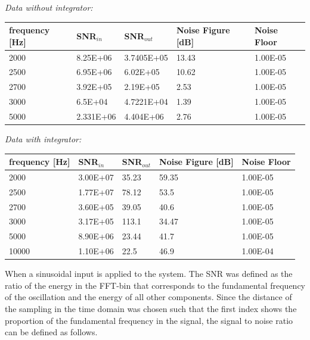 \textit{Data without integrator:}
\begin{center}
\begin{tabular}{|m{3cm}|m{3cm}|m{1.3cm}|m{4cm}|m{2cm}|} 
\hline
frequency [Hz]& SNR$_{in}$ & SNR$_{out}$ & Noise Figure [dB] & Noise Floor \\ 
\hline \hline
2000 &  8.25E+06 &  3.7405E+05 & 13.43 & 1.00E-05 \\ 
\hline
2500 & 6.95E+06 & 6.02E+05 & 10.62 & 1.00E-05 \\ 
\hline
2700 & 3.92E+05 & 2.19E+05 & 2.53 & 1.00E-05 \\ 
\hline
3000 & 6.5E+04 & 4.7221E+04 & 1.39 & 1.00E-05 \\ 
\hline
5000 & 2.331E+06 & 4.404E+06 & 2.76 & 1.00E-05 \\ 
\hline
\end{tabular}
\end{center}


\textit{Data with integrator:}
\begin{center}
\begin{tabular}{|m{3cm}|m{3cm}|m{1.3cm}|m{4cm}|m{2cm}|} 
\hline
frequency [Hz]& SNR$_{in}$ & SNR$_{out}$ & Noise Figure [dB] & Noise Floor \\ 
\hline \hline
2000 & 3.00E+07 & 35.23 & \cellcolor{blue!25}59.35 & 1.00E-05 \\ 
\hline
2500 & 1.77E+07 & 78.12 & \cellcolor{blue!25}53.5 & 1.00E-05 \\ 
\hline
2700 & 3.60E+05 & 39.05 & \cellcolor{blue!25}40.6 & 1.00E-05 \\ 
\hline
3000 & 3.17E+05 & 113.1 & \cellcolor{blue!25}34.47 & 1.00E-05 \\ 
\hline
5000 & 8.90E+06 & 23.44 & \cellcolor{blue!25}41.7 & 1.00E-05 \\ 
\hline
10000 & 1.10E+06 & 22.5 & \cellcolor{red!25}46.9 & 1.00E-04 \\ 
\hline

\end{tabular}

\end{center}
When a sinusoidal input is applied to the system. The SNR was defined as the ratio of the energy in the FFT-bin that corresponds
to the fundamental frequency of the oscillation and the energy of all other components. Since the distance of the sampling in the time domain was chosen
such that the first index shows the proportion of the fundamental frequency in the signal, the signal to
noise ratio can be defined as follows.


